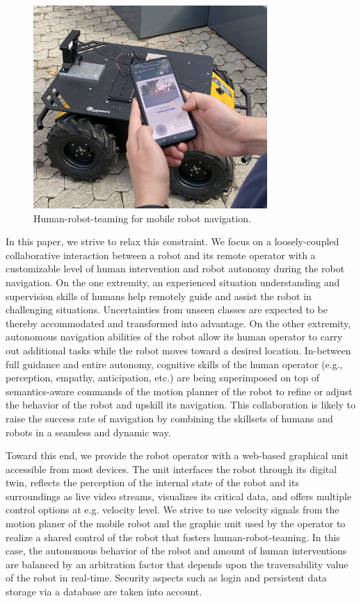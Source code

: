 \documentclass[letterpaper, 10 pt, conference]{ieeeconf}  %
\begin{document}
\begin{figure}[t]
	\centerline{\includegraphics[width=8.9cm]{images/galaxycontrol.jpg}}
	\caption{Human-robot-teaming for mobile robot navigation.}
	\label{fig:galaxycontrol}
\end{figure}


In this paper, we strive to relax this constraint. We focus on a loosely-coupled collaborative interaction between a  robot and its remote operator  with a customizable level of human intervention and robot autonomy during the robot navigation. On the one extremity, an experienced situation understanding and  supervision skills of humans help remotely guide and assist the robot in challenging situations. Uncertainties from unseen classes are expected to be thereby accommodated and transformed into advantage. On the other extremity, autonomous navigation abilities of the robot allow its human operator to carry out additional tasks while the robot moves toward a desired location. In-between full guidance and entire autonomy, cognitive skills of the human operator (e.g., perception, empathy, anticipation, etc.) are being superimposed on top of semantics-aware commands of the motion planner of the robot to refine or adjust the behavior of the robot and upskill its navigation. This collaboration is likely to raise the success rate of  navigation by combining the skillsets of humans and robots in a seamless and dynamic way.



Toward this end, we  provide the robot operator with a web-based graphical unit accessible from most devices. The unit interfaces the robot through its digital twin, reflects the perception of the internal state of the robot and its surroundings as live video streams, visualizes its critical data, and offers multiple control options at e.g. velocity level. We strive to use  velocity signals from the motion planer of the mobile robot and the graphic unit used by the operator to realize a shared control \cite{phri} of the robot that fosters human-robot-teaming. In this case, the  autonomous behavior of the robot and amount of human interventions are  balanced by an arbitration factor that depends upon the traversability value of the robot in real-time. Security aspects such as login and persistent data storage via a database are  taken into account. 
\end{document}
